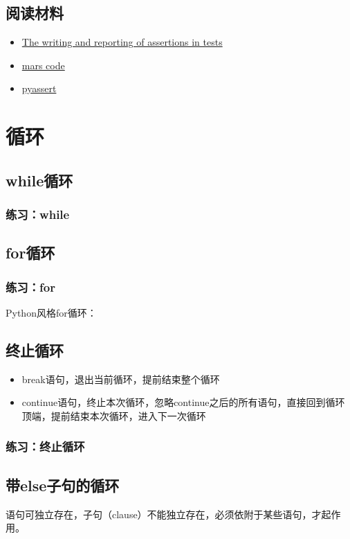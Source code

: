 \subsection{阅读材料}
\begin{itemize}
\item \href{https://docs.pytest.org/en/latest/assert.html}{The writing and reporting of assertions in tests}
\item \href{https://cacm.acm.org/magazines/2014/2/171689-mars-code/abstract}{mars code}
\item \href{https://github.com/pyclectic/pyassert}{pyassert}
\end{itemize}

\section{循环}
\subsection{while循环}
\subsubsection{练习：while}
\subsection{for循环}
\subsubsection{练习：for}
Python风格for循环： 
\subsection{终止循环}
\begin{itemize}
\item break语句，退出当前循环，提前结束整个循环
\item continue语句，终止本次循环，忽略continue之后的所有语句，直接回到循环顶端，提前结束本次循环，进入下一次循环
\end{itemize}
\subsubsection{练习：终止循环}
\subsection{带else子句的循环}
语句可独立存在，子句（clause）不能独立存在，必须依附于某些语句，才起作用。
